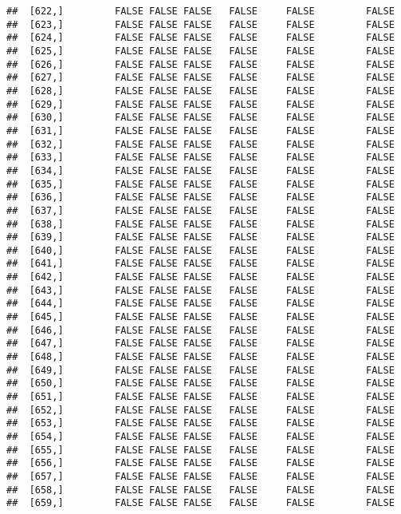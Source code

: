 \documentclass[
]{article}
\begin{document}
\begin{verbatim}
##  [622,]         FALSE FALSE FALSE   FALSE     FALSE         FALSE
##  [623,]         FALSE FALSE FALSE   FALSE     FALSE         FALSE
##  [624,]         FALSE FALSE FALSE   FALSE     FALSE         FALSE
##  [625,]         FALSE FALSE FALSE   FALSE     FALSE         FALSE
##  [626,]         FALSE FALSE FALSE   FALSE     FALSE         FALSE
##  [627,]         FALSE FALSE FALSE   FALSE     FALSE         FALSE
##  [628,]         FALSE FALSE FALSE   FALSE     FALSE         FALSE
##  [629,]         FALSE FALSE FALSE   FALSE     FALSE         FALSE
##  [630,]         FALSE FALSE FALSE   FALSE     FALSE         FALSE
##  [631,]         FALSE FALSE FALSE   FALSE     FALSE         FALSE
##  [632,]         FALSE FALSE FALSE   FALSE     FALSE         FALSE
##  [633,]         FALSE FALSE FALSE   FALSE     FALSE         FALSE
##  [634,]         FALSE FALSE FALSE   FALSE     FALSE         FALSE
##  [635,]         FALSE FALSE FALSE   FALSE     FALSE         FALSE
##  [636,]         FALSE FALSE FALSE   FALSE     FALSE         FALSE
##  [637,]         FALSE FALSE FALSE   FALSE     FALSE         FALSE
##  [638,]         FALSE FALSE FALSE   FALSE     FALSE         FALSE
##  [639,]         FALSE FALSE FALSE   FALSE     FALSE         FALSE
##  [640,]         FALSE FALSE FALSE   FALSE     FALSE         FALSE
##  [641,]         FALSE FALSE FALSE   FALSE     FALSE         FALSE
##  [642,]         FALSE FALSE FALSE   FALSE     FALSE         FALSE
##  [643,]         FALSE FALSE FALSE   FALSE     FALSE         FALSE
##  [644,]         FALSE FALSE FALSE   FALSE     FALSE         FALSE
##  [645,]         FALSE FALSE FALSE   FALSE     FALSE         FALSE
##  [646,]         FALSE FALSE FALSE   FALSE     FALSE         FALSE
##  [647,]         FALSE FALSE FALSE   FALSE     FALSE         FALSE
##  [648,]         FALSE FALSE FALSE   FALSE     FALSE         FALSE
##  [649,]         FALSE FALSE FALSE   FALSE     FALSE         FALSE
##  [650,]         FALSE FALSE FALSE   FALSE     FALSE         FALSE
##  [651,]         FALSE FALSE FALSE   FALSE     FALSE         FALSE
##  [652,]         FALSE FALSE FALSE   FALSE     FALSE         FALSE
##  [653,]         FALSE FALSE FALSE   FALSE     FALSE         FALSE
##  [654,]         FALSE FALSE FALSE   FALSE     FALSE         FALSE
##  [655,]         FALSE FALSE FALSE   FALSE     FALSE         FALSE
##  [656,]         FALSE FALSE FALSE   FALSE     FALSE         FALSE
##  [657,]         FALSE FALSE FALSE   FALSE     FALSE         FALSE
##  [658,]         FALSE FALSE FALSE   FALSE     FALSE         FALSE
##  [659,]         FALSE FALSE FALSE   FALSE     FALSE         FALSE

\end{verbatim}
\end{document}
